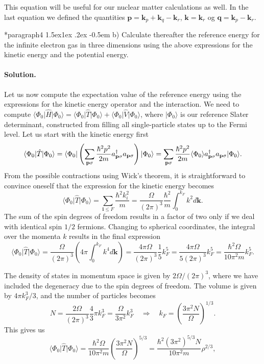 \documentclass[%
oneside,                 %
final,                   %
10pt]{article}
\makeatletter
\newenvironment{doconceexercise}{}{}
\newcommand\subex{\@startsection*{paragraph}{4}{\z@}%
                  {1.5ex\@plus1ex \@minus.2ex}%
                  {-0.5em}%
                  {\normalfont\normalsize\bfseries}}
\makeatother
\begin{document}
\begin{doconceexercise}
This equation will be useful for our nuclear matter calculations as well. In the last equation we defined
the quantities
$\mathbf{p} = \mathbf{k}_p + \mathbf{k}_q - \mathbf{k}_r$, $\mathbf{k} = \mathbf{k}_r$ og $\mathbf{q} = \mathbf{k}_p - \mathbf{k}_r$.


\subex{b)}
Calculate thereafter the reference energy for the infinite electron gas in three dimensions using the above expressions for the kinetic energy and the potential energy.


\paragraph{Solution.}
Let us now compute the expectation value of the reference energy using the expressions for the kinetic energy operator and the interaction.
We need to compute $\langle \Phi_0\vert \hat{H} \vert \Phi_0\rangle = \langle \Phi_0\vert \hat{T} \vert \Phi_0\rangle + \langle \Phi_0\vert \hat{V} \vert \Phi_0\rangle$, where $\vert \Phi_0\rangle$ is our reference Slater determinant, constructed from filling all single-particle states up to the Fermi level.
Let us start with the kinetic energy first
\[ \langle \Phi_0\vert \hat{T} \vert \Phi_0\rangle 
= \langle \Phi_0\vert \left( \sum_{\mathbf{p} \sigma} \frac{\hbar^2 p^2}{2m} a_{\mathbf{p} \sigma}^\dagger a_{\mathbf{p} \sigma} \right) \vert \Phi_0\rangle \\
= \sum_{\mathbf{p} \sigma} \frac{\hbar^2 p^2}{2m} \langle \Phi_0\rangle a_{\mathbf{p} \sigma}^\dagger a_{\mathbf{p} \sigma} \vert \Phi_0\rangle . \]
From the possible contractions using Wick's theorem, it is straightforward to convince oneself that the expression for the kinetic energy becomes
\[ \langle \Phi_0\vert \hat{T} \vert \Phi_0\rangle = \sum_{\mathbf{i} \leq F} \frac{\hbar^2 k_i^2}{m} = \frac{\Omega}{(2\pi)^3} \frac{\hbar^2}{m} \int_0^{k_F} k^2 d\mathbf{k}.
\]
The sum of the spin degrees of freedom results in  a factor of two only if we deal with identical spin $1/2$ fermions. 
Changing to spherical coordinates, the integral over the momenta $k$ results in the final expression
\[ \langle \Phi_0\vert \hat{T} \vert \Phi_0\rangle = \frac{\Omega}{(2\pi)^3} \left( 4\pi \int_0^{k_F} k^4 d\mathbf{k} \right) = \frac{4\pi\Omega}{(2\pi)^3} \frac{1}{5} k_F^5 = \frac{4\pi\Omega}{5(2\pi)^3} k_F^5 = \frac{\hbar^2 \Omega}{10\pi^2 m} k_F^5 . \]

The density of states in momentum space is given by $2\Omega/(2\pi)^3$, where we have included the degeneracy due to the spin degrees of freedom.
The volume is given by  $4\pi k_F^3/3$, and the number of particles becomes
\[ N = \frac{2\Omega}{(2\pi)^3} \frac{4}{3} \pi k_F^3 = \frac{\Omega}{3\pi^2} k_F^3 \quad \Rightarrow \quad
k_F = \left( \frac{3\pi^2 N}{\Omega} \right)^{1/3}. \]
This gives us
\begin{equation}
\langle \Phi_0\vert \hat{T} \vert \Phi_0\rangle =
\frac{\hbar^2 \Omega}{10\pi^2 m} \left( \frac{3\pi^2 N}{\Omega} \right)^{5/3} =
\frac{\hbar^2 (3\pi^2)^{5/3} N}{10\pi^2 m} \rho^{2/3} ,
\label{eq:T_forventning}
\end{equation}


\end{doconceexercise}
\end{document}

